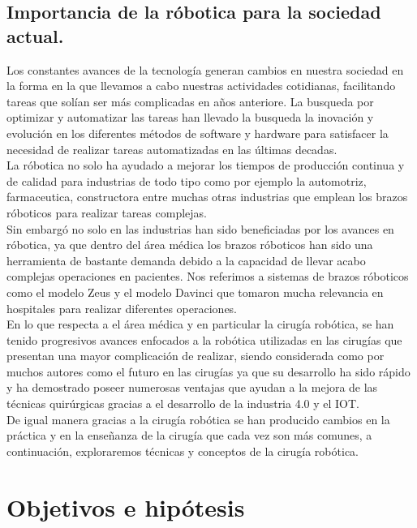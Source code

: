 \documentclass[12pt]{book} %
\begin{document}
	\section{Importancia de la róbotica para la sociedad actual.}

	Los constantes avances de la tecnología generan cambios en nuestra sociedad en la forma en la que llevamos a cabo nuestras actividades cotidianas, facilitando tareas que solían ser más complicadas en años anteriore. La busqueda por optimizar y automatizar las tareas han llevado la busqueda la inovación y evolución en los diferentes métodos de software y hardware para satisfacer la necesidad de realizar tareas automatizadas en las últimas decadas.\\
	La róbotica no solo ha ayudado a mejorar los tiempos de producción continua y de calidad para industrias de todo tipo como por ejemplo la automotriz, farmaceutica, constructora entre muchas otras industrias que emplean los brazos róboticos para realizar tareas complejas.\\
	Sin embargó no solo en las industrias han sido beneficiadas por los avances en róbotica, ya que dentro del área médica los brazos róboticos han sido una herramienta de bastante demanda debido a la capacidad de llevar acabo complejas operaciones en pacientes. Nos referimos a sistemas de brazos róboticos como el modelo Zeus y el modelo Davinci que tomaron mucha relevancia en hospitales para realizar diferentes operaciones.\\
En lo que respecta a el área médica y en particular la cirugía robótica, se han tenido progresivos avances enfocados a la robótica utilizadas en las cirugías que presentan una mayor complicación de realizar, siendo considerada como por muchos autores como el futuro en las cirugías ya que su desarrollo ha sido rápido y ha demostrado poseer numerosas ventajas que ayudan a la mejora de las técnicas quirúrgicas gracias a el desarrollo de la industria 4.0 y el IOT.\\
De igual manera gracias a la cirugía robótica se han producido
cambios en la práctica y en la enseñanza de la cirugía que cada vez son más comunes, a continuación, exploraremos técnicas y conceptos de la cirugía robótica.	\\
	
\chapter{Objetivos e hipótesis} \label{cap.Objetivos} 
 
\end{document}
